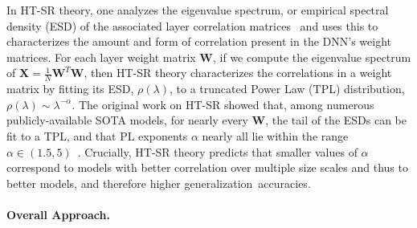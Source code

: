 \documentclass{article}
\begin{document}
In HT-SR theory, one analyzes the eigenvalue spectrum, or empirical spectral density (ESD) 
of the associated layer correlation matrices~\cite{MM18_TR,MM19_HTSR_ICML,MM20_SDM}
and uses this to characterizes the amount and form of correlation present in the DNN's weight matrices.
For each layer weight matrix $\mathbf{W}$, if we compute the eigenvalue spectrum of 
$ \mathbf{X} = \frac{1}{N}\mathbf{W}^{T}\mathbf{W} $,
then HT-SR theory characterizes the correlations in a weight matrix by fitting its ESD, $\rho(\lambda)$,
to a truncated Power Law (TPL) distribution,  $\rho(\lambda)\sim\lambda^{-\alpha} $.
%
The original work on HT-SR showed that, among numerous publicly-available SOTA models, for nearly every $\mathbf{W}$, the tail of the ESDs can be fit to a  TPL, and that
PL exponents $\alpha$ nearly all lie within the range $\alpha\in(1.5,5)$~\cite{MM18_TR,MM19_HTSR_ICML,MM20_SDM}.
%
%
Crucially, HT-SR theory predicts that smaller values of $\alpha$ correspond to models with better correlation over multiple size scales and thus to better models,
and therefore higher generalization~accuracies.


\vspace{-5mm}
\paragraph{Overall Approach.}
\end{document}
